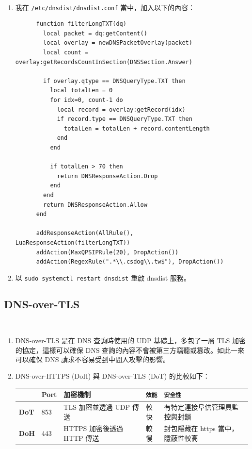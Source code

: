 \documentclass[12pt]{article}
\newenvironment{problem}[2][Problem]{\begin{trivlist}
\item[\hskip \labelsep {\bfseries #1}\hskip \labelsep {\bfseries #2}]}{\end{trivlist}}
\begin{document}
\begin{problem}{3.1.2} 　
  \begin{enumerate}
    \item 我在 \texttt{/etc/dnsdist/dnsdist.conf} 當中，加入以下的內容：
    \begin{verbatim}
      function filterLongTXT(dq)
        local packet = dq:getContent()
        local overlay = newDNSPacketOverlay(packet)
        local count = overlay:getRecordsCountInSection(DNSSection.Answer)

        if overlay.qtype == DNSQueryType.TXT then
          local totalLen = 0
          for idx=0, count-1 do
            local record = overlay:getRecord(idx)
            if record.type == DNSQueryType.TXT then
              totalLen = totalLen + record.contentLength
            end
          end

          if totalLen > 70 then
            return DNSResponseAction.Drop
          end
        end
        return DNSResponseAction.Allow
      end

      addResponseAction(AllRule(), LuaResponseAction(filterLongTXT))
      addAction(MaxQPSIPRule(20), DropAction())
      addAction(RegexRule(".*\\.csdog\\.tw$"), DropAction())
    \end{verbatim}
  \item 以 \texttt{sudo systemctl restart dnsdist} 重啟 dnsdist 服務。
\end{enumerate}

\end{problem}

\subsection{DNS-over-TLS}


\begin{problem}{3.2.1} 　
  \begin{enumerate}[label=(\alph*)]
    \item DNS-over-TLS 是在 DNS 查詢時使用的 UDP 基礎上，多包了一層 TLS 加密的協定，這樣可以確保 DNS 查詢的內容不會被第三方竊聽或篡改。如此一來可以確保 DNS 請求不容易受到中間人攻擊的影響。
    \item  DNS-over-HTTPS (DoH) 與 DNS-over-TLS (DoT) 的比較如下：
    \begin{table}[H]
      \centering
      \begin{tabular}{lllll}
        \toprule
        & \textbf{Port} & \textbf{加密機制} & \texttt{效能} & \texttt{安全性}\\
        \midrule
        \textbf{DoT} & 853 & TLS 加密並透過 UDP 傳送 & 較快 & 有特定連接阜供管理員監控與封鎖 \\
        \textbf{DoH} & 443 & HTTPS 加密後透過 HTTP 傳送 & 較慢 & 封包隱藏在 https 當中，隱蔽性較高\\
        \bottomrule
      \end{tabular}
    \end{table}
  \end{enumerate}
\end{problem}
\end{document}
